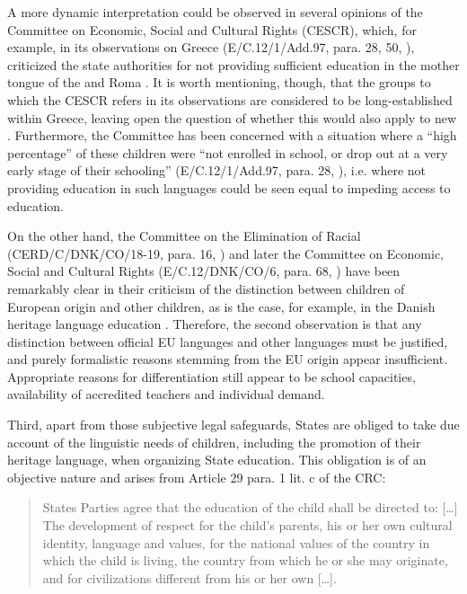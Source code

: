 \documentclass[output=paper,colorlinks,citecolor=brown]{langscibook}
\begin{document}
A more dynamic interpretation could be observed in several opinions of the Committee on Economic, Social and Cultural Rights (CESCR), which, for example, in its observations on Greece (E/C.12/1/Add.97, para. 28, 50, \citealt{cesc2004}), criticized the state authorities for not providing sufficient education in the mother tongue of the  and Roma  \citep[1134]{saul2014}. It is worth mentioning, though, that the groups to which the CESCR refers in its observations are considered to be long-established  within Greece, leaving open the question of whether this would also apply to new . Furthermore, the Committee has been concerned with a situation where a ``high percentage'' of these children were ``not enrolled in school, or drop out at a very early stage of their schooling'' (E/C.12/1/Add.97, para. 28, \citealt{cesc2004}), i.e. where not providing education in such languages could be seen equal to impeding access to education.

On the other hand, the Committee on the Elimination of Racial  (CERD/C/DNK/CO/18-19, para. 16, \citealt{cerd2010}) and later the Committee on Economic, Social and Cultural Rights (E/C.12/DNK/CO/6, para. 68, \citealt{cescr2019}) have been remarkably clear in their criticism of the distinction between children of European origin and other children, as is the case, for example, in the Danish heritage language education \citep[37--38]{hofmann_malkmus2022a}. Therefore, the second observation is that any distinction between official EU languages and other languages must be justified, and purely formalistic reasons stemming from the EU origin appear insufficient. Appropriate reasons for differentiation still appear to be school capacities, availability of accredited teachers and individual demand.

Third, apart from those subjective legal safeguards, States are obliged to take due account of the linguistic needs of children, including the promotion of their heritage language, when organizing State education. This obligation is of an objective nature and arises from Article 29 para. 1 lit. c of the CRC:

\begin{quote}
    States Parties agree that the education of the child shall be directed to: […] The development of respect for the child's parents, his or her own cultural identity, language and values, for the national values of the country in which the child is living, the country from which he or she may originate, and for civilizations different from his or her own […].
\end{quote}
\end{document}
